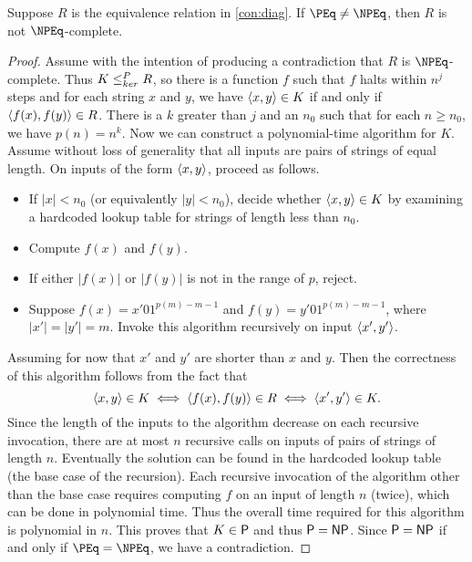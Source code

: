 \begin{lemma}
  Suppose $R$ is the equivalence relation in \autoref{con:diag}.
  If $\PEq \neq \NPEq$, then $R$ is not $\NPEq$-complete.
\end{lemma}
\begin{proof}
  Assume with the intention of producing a contradiction that $R$ is $\NPEq$-complete.
  Thus $K \kr R$, so there is a function $f$ such that $f$ halts within $n^j$ steps and for each string $x$ and $y$, we have $\pair{x}{y} \in K$ if and only if $\pair{f(x)}{f(y)} \in R$.
  There is a $k$ greater than $j$ and an $n_0$ such that for each $n \geq n_0$, we have $p(n) = n^k$.
  Now we can construct a polynomial-time algorithm for $K$.
  Assume without loss of generality that all inputs are pairs of strings of equal length.
  On inputs of the form $\pair{x}{y}$, proceed as follows.
  \begin{itemize}
  \item If $|x| < n_0$ (or equivalently $|y| < n_0$), decide whether $\pair{x}{y} \in K$ by examining a hardcoded lookup table for strings of length less than $n_0$.
  \item Compute $f(x)$ and $f(y)$.
  \item If either $|f(x)|$ or $|f(y)|$ is not in the range of $p$, reject.
  \item
    Suppose $f(x) = x' 0 1^{p(m) - m - 1}$ and $f(y) = y' 0 1^{p(m) - m - 1}$, where $|x'| = |y'| = m$.
    Invoke this algorithm recursively on input $\pair{x'}{y'}$.
  \end{itemize}

  Assuming for now that $x'$ and $y'$ are shorter than $x$ and $y$.
  Then the correctness of this algorithm follows from the fact that
  \begin{equation*}
    \pair{x}{y} \in K \iff \pair{f(x)}{f(y)} \in R \iff \pair{x'}{y'} \in K.
  \end{equation*}
  Since the length of the inputs to the algorithm decrease on each recursive invocation, there are at most $n$ recursive calls on inputs of pairs of strings of length $n$.
  Eventually the solution can be found in the hardcoded lookup table (the base case of the recursion).
  Each recursive invocation of the algorithm other than the base case requires computing $f$ on an input of length $n$ (twice), which can be done in polynomial time.
  Thus the overall time required for this algorithm is polynomial in $n$.
  This proves that $K \in \P$ and thus $\P = \NP$.
  Since $\P = \NP$ if and only if $\PEq = \NPEq$, we have a contradiction.


\end{proof}

